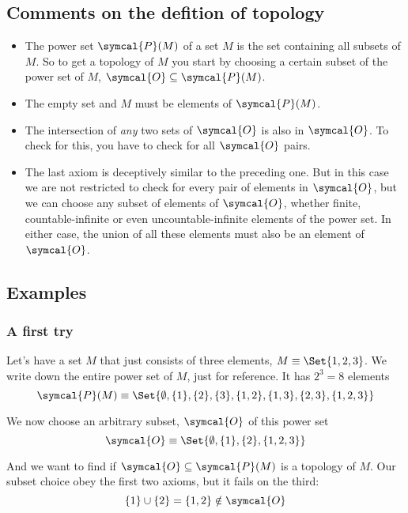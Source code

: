 \subsection{Comments on the defition of topology}
\begin{itemize}
\item The power set $\symcal{P}(M)$ of a set $M$ is the set containing all subsets of $M$.
  So to get a topology of $M$ you start by choosing a certain subset of the power set of $M$,
  $\symcal{O} \subseteq\symcal{P}(M)$.
\item The empty set and $M$ must be elements of $\symcal{P}(M)$.
\item The intersection of \emph{any} two sets of $\symcal{O}$ is also in $\symcal{O}$.
  To check for this, you have to check for all $\symcal{O}$ pairs.
\item The last axiom is deceptively similar to the preceding one. But in this case we are not
  restricted to check for every pair of elements in $\symcal{O}$, but we can choose any subset
  of elements of $\symcal{O}$, whether finite, countable-infinite or even uncountable-infinite
  elements of the power set. In either case, the union of all these elements must also be an
  element of $\symcal{O}$.
\end{itemize}

\subsection{Examples}
\subsubsection{A first try}
Let's have a set $M$ that just consists of three elements, $M\equiv\Set{1,2,3}$. We write down
the entire power set of $M$, just for reference. It has $2^3 = 8$ elements
\[
  \symcal{P}(M)
  \equiv \Set{\emptyset, \{1\}, \{2\}, \{3\}, \{1,2\}, \{1,3\}, \{2,3\}, \{1,2,3\}}
\]

We now choose an arbitrary subset, $\symcal{O}$ of this power set
\[
  \symcal{O} \equiv \Set{\emptyset, \{1\}, \{2\}, \{1,2,3\}}
\]

And we want to find if $\symcal{O} \subseteq \symcal{P}(M)$ is a topology of $M$.
Our subset choice obey the first two axioms, but it fails on the third:
\[
  \{1\}\cup\{2\} = \{1,2\}\notin\symcal{O}
\]

